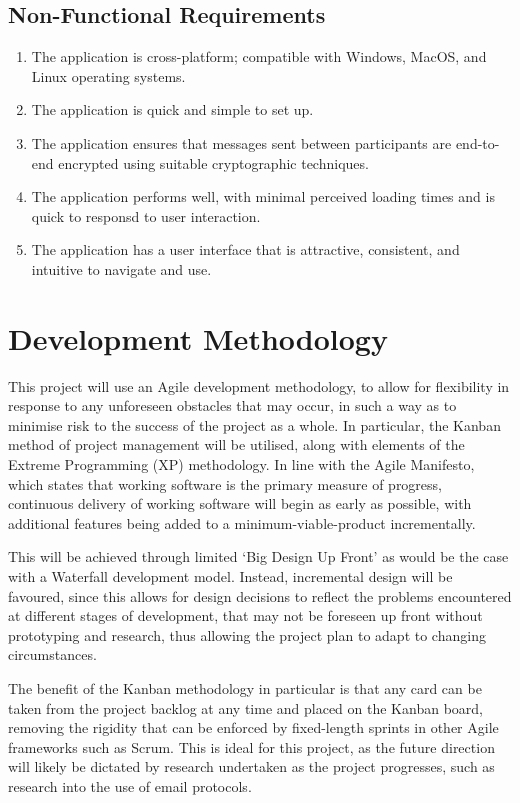\subsection{Non-Functional Requirements}
\begin{enumerate}
  \item The application is cross-platform; compatible with Windows, MacOS, and Linux operating systems.
  \item The application is quick and simple to set up.
  \item The application ensures that messages sent between participants are end-to-end encrypted using suitable cryptographic techniques.
  \item The application performs well, with minimal perceived loading times and is quick to responsd to user interaction.
  \item The application has a user interface that is attractive, consistent, and intuitive to navigate and use.
\end{enumerate}

\section{Development Methodology}\label{sec:development-methodology}

This project will use an Agile development methodology, to allow for flexibility in response to any unforeseen obstacles that may occur, in such a way as to minimise risk to the success of the project as a whole. In particular, the Kanban method of project management will be utilised, along with elements of the Extreme Programming (XP) methodology. In line with the Agile Manifesto, which states that working software is the primary measure of progress, continuous delivery of working software will begin as early as possible, with additional features being added to a minimum-viable-product incrementally.

This will be achieved through limited `Big Design Up Front' as would be the case with a Waterfall development model. Instead, incremental design will be favoured, since this allows for design decisions to reflect the problems encountered at different stages of development, that may not be foreseen up front without prototyping and research, thus allowing the project plan to adapt to changing circumstances.

The benefit of the Kanban methodology in particular is that any card can be taken from the project backlog at any time and placed on the Kanban board, removing the rigidity that can be enforced by fixed-length sprints in other Agile frameworks such as Scrum. This is ideal for this project, as the future direction will likely be dictated by research undertaken as the project progresses, such as research into the use of email protocols.

